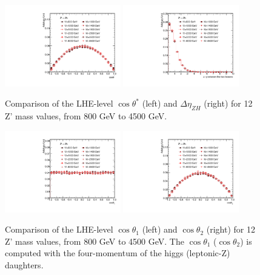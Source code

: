 \begin{figure}[htbp]
   \centering
   \includegraphics[width=0.45\textwidth]{optimization/LHE_study/LHE_XZh_cosThetaStar.pdf}
   \includegraphics[width=0.45\textwidth]{optimization/LHE_study/LHE_XZh_B_dEta.pdf}
   \caption{Comparison of the LHE-level $\cos{\theta^*}$ (left) and 
$\Delta \eta_{ZH}$ (right) for 12 Z' mass values, from 800 GeV to 4500 GeV.}
   \label{fig:lheone}
\end{figure}


\begin{figure}[htbp]
   \centering
   \includegraphics[width=0.45\textwidth]{optimization/LHE_study/LHE_XZh_cosTheta1.pdf}
   \includegraphics[width=0.45\textwidth]{optimization/LHE_study/LHE_XZh_cosTheta2.pdf}
   \caption{Comparison of the LHE-level $\cos{\theta_1}$ (left) and 
$\cos{\theta_2}$ (right) for 12 Z' mass values, from 800 GeV to 4500 GeV. 
The $\cos{\theta_1}$ ($\cos{\theta_2}$) is computed with the four-momentum of 
the higgs (leptonic-Z) daughters.}
   \label{fig:lhetwo}
\end{figure}

